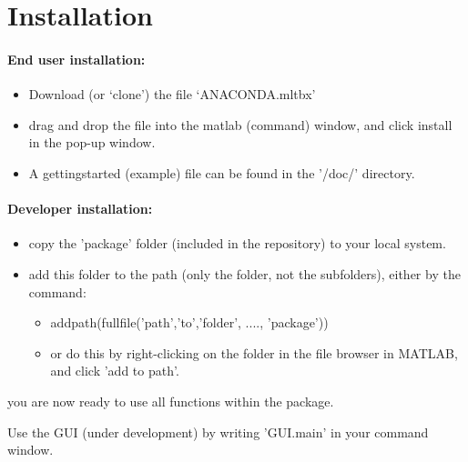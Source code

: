 \section{Installation}


\paragraph{End user installation:}
\begin{itemize}
\item Download (or `clone') the file `ANACONDA.mltbx'
\item drag and drop the file into the matlab (command) window, and click install in the pop-up window.
\item A gettingstarted (example) file can be found in the '/doc/' directory.
\end{itemize}

\paragraph{Developer installation:}
\begin{itemize}
\item copy the 'package' folder (included in the repository) to your local system.
\item add this folder to the path (only the folder, not the subfolders), either by the command:
	\begin{itemize}
		\item addpath(fullfile('path','to','folder', ...., 'package'))
		\item or do this by right-clicking on the folder in the file browser in MATLAB, and click 'add to path'.
	\end{itemize}
\end{itemize}

you are now ready to use all functions within the package. 

Use the GUI (under development) by writing 'GUI.main' in your command window.
